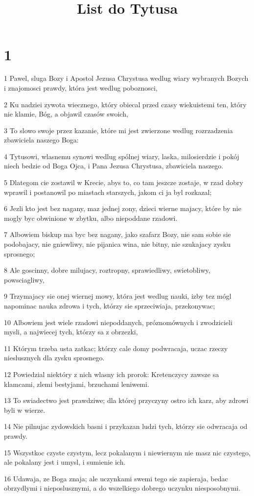 

\title{List do Tytusa}


\chapter{1}

\par 1 Pawel, sluga Bozy i Apostol Jezusa Chrystusa wedlug wiary wybranych Bozych i znajomosci prawdy, która jest wedlug poboznosci,
\par 2 Ku nadziei zywota wiecznego, który obiecal przed czasy wiekuistemi ten, który nie klamie, Bóg, a objawil czasów swoich,
\par 3 To slowo swoje przez kazanie, które mi jest zwierzone wedlug rozrzadzenia zbawiciela naszego Boga:
\par 4 Tytusowi, wlasnemu synowi wedlug spólnej wiary, laska, milosierdzie i pokój niech bedzie od Boga Ojca, i Pana Jezusa Chrystusa, zbawiciela naszego.
\par 5 Dlategom cie zostawil w Krecie, abys to, co tam jeszcze zostaje, w rzad dobry wprawil i postanowil po miastach starszych, jakom ci ja byl rozkazal;
\par 6 Jezli kto jest bez nagany, maz jednej zony, dzieci wierne majacy, które by nie mogly byc obwinione w zbytku, albo niepoddane rzadowi.
\par 7 Albowiem biskup ma byc bez nagany, jako szafarz Bozy, nie sam sobie sie podobajacy, nie gniewliwy, nie pijanica wina, nie bitny, nie szukajacy zysku sprosnego;
\par 8 Ale goscinny, dobre milujacy, roztropny, sprawiedliwy, swietobliwy, powsciagliwy,
\par 9 Trzymajacy sie onej wiernej mowy, która jest wedlug nauki, izby tez mógl napominac nauka zdrowa i tych, którzy sie sprzeciwiaja, przekonywac;
\par 10 Albowiem jest wiele rzadowi niepoddanych, próznomównych i zwodzicieli mysli, a najwiecej tych, którzy sa z obrzezki,
\par 11 Którym trzeba usta zatkac; którzy cale domy podwracaja, uczac rzeczy nieslusznych dla zysku sprosnego.
\par 12 Powiedzial niektóry z nich wlasny ich prorok: Kretenczycy zawsze sa klamcami, zlemi bestyjami, brzuchami leniwemi.
\par 13 To swiadectwo jest prawdziwe; dla której przyczyny ostro ich karz, aby zdrowi byli w wierze.
\par 14 Nie pilnujac zydowskich basni i przykazan ludzi tych, którzy sie odwracaja od prawdy.
\par 15 Wszystkoc czyste czystym, lecz pokalanym i niewiernym nie masz nic czystego, ale pokalany jest i umysl, i sumienie ich.
\par 16 Udawaja, ze Boga znaja; ale uczynkami swemi tego sie zapieraja, bedac obrzydlymi i nieposlusznymi, a do wszelkiego dobrego uczynku niesposobnymi.

